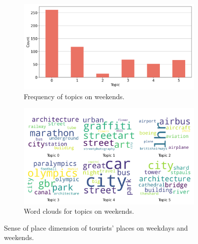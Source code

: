 \documentclass{article}
\theoremstyle{definition}
\theoremstyle{remark}
\begin{document}
\begin{figure}[!h]
    \begin{subfigure}{0.45\textwidth}
        \centering
        \includegraphics[width=\linewidth]{figures/places_sense_weekend_tourists.png}
        \caption{Frequency of topics on weekends.}
        \label{fig:places_sense_weekdend_tourists}
    \end{subfigure}
    \hfill
    \begin{subfigure}{0.5\textwidth}
        \centering
        \includegraphics[width=\linewidth]{figures/topics_weekend_tourists.png}
        \caption{Word clouds for topics on weekends.}
        \label{fig:topics_weekend_tourists}
    \end{subfigure}

    \caption{Sense of place dimension of tourists' places on weekdays and weekends.}
    \label{fig:places_topics_sense_tourists_week}
\end{figure}

\end{document}

